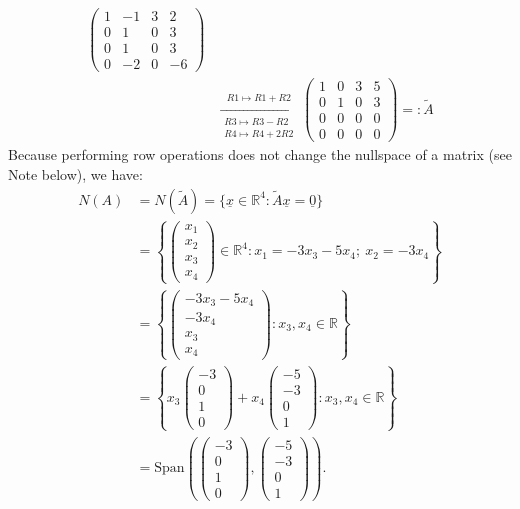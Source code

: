\documentclass[
  12pt,
  a4paper,
  twoside]{article}
\theoremstyle{plain}
\theoremstyle{definition}
\begin{document}
\begin{enumerate}
\begin{align*}
  \begin{pmatrix} 1 & -1 & 3 & 2 \\ 0 & 1 & 0 & 3 \\ 0 & 1 & 0 & 3 \\ 0 & -2 & 0 & -6 \end{pmatrix}
  \\
  &\xrightarrow[\substack{R3 \mapsto R3 - R2 \\ R4 \mapsto R4 + 2R2}]{R1 \mapsto R1 + R2}
  \begin{pmatrix} 1 & 0 & 3 & 5 \\ 0 & 1 & 0 & 3 \\ 0 & 0 & 0 & 0 \\ 0 & 0 & 0 & 0 \end{pmatrix} =: \widetilde{A}
  \end{align*}
  Because performing row operations does not change the nullspace of a matrix (see Note below), we have:
  \begin{align*}
  N(A) &= N(\widetilde{A}) = \{ \underline{x} \in \mathbb{R}^4 : \widetilde{A} \underline{x} = \underline{0} \}
  \\ & = \left\{ \begin{pmatrix} x_1 \\ x_2 \\ x_3 \\ x_4 \end{pmatrix} \in \mathbb{R}^4 : x_1 = -3x_3 - 5x_4 ; \ x_2 = -3x_4 \right\}
  \\ & = \left\{ \begin{pmatrix} -3x_3 - 5x_4 \\ -3x_4 \\ x_3 \\ x_4 \end{pmatrix} : x_3, x_4 \in \mathbb{R} \right\}
  \\ & = \left\{ x_3 \begin{pmatrix} -3 \\ 0 \\ 1 \\ 0 \end{pmatrix} + x_4 \begin{pmatrix} -5 \\ -3 \\ 0 \\ 1 \end{pmatrix} : x_3, x_4 \in \mathbb{R} \right\}
  \\ & = \mathrm{Span}\left( \begin{pmatrix} -3 \\ 0 \\ 1 \\ 0 \end{pmatrix}, \begin{pmatrix} -5 \\ -3 \\ 0 \\ 1 \end{pmatrix} \right).

\end{align*}
\end{enumerate}
\end{document}
